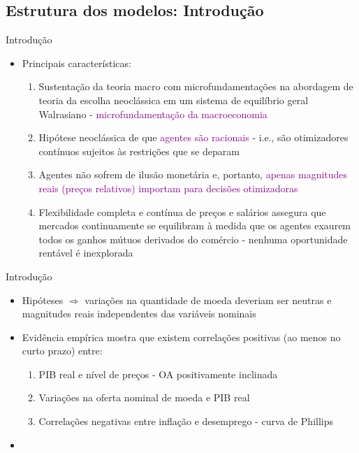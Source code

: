 \documentclass[10pt]{beamer}
\begin{document}
\subsection{Estrutura dos modelos: Introdução}
\begin{frame}{Introdução}
    \begin{itemize}
        \item Principais características:
        \bigskip
        \begin{enumerate}
            \item Sustentação da teoria macro com microfundamentações na abordagem de teoria da escolha neoclássica em um sistema de equilíbrio geral Walrasiano - \textcolor{purple}{microfundamentação da macroeconomia}
            \bigskip
            \item Hipótese neoclássica de que \textcolor{purple}{agentes são racionais} - i.e., são otimizadores contínuos sujeitos às restrições que se deparam
            \bigskip
            \item Agentes não sofrem de ilusão monetária e, portanto, \textcolor{purple}{apenas magnitudes reais (preços relativos) importam para decisões otimizadoras}
            \bigskip
            \item Flexibilidade completa e contínua de preços e salários assegura que mercados continuamente se equilibram à medida que os agentes exaurem todos os ganhos mútuos derivados do comércio - nenhuma oportunidade rentável é inexplorada
        \end{enumerate}
    \end{itemize}
\end{frame}

\begin{frame}{Introdução}
    \begin{itemize}
        \item Hipóteses $\Rightarrow$ variações na quantidade de moeda deveriam ser neutras e magnitudes reais independentes das variáveis nominais
        \bigskip
        \item Evidência empírica mostra que existem correlações positivas (ao menos no curto prazo) entre:
        \bigskip
        \begin{enumerate}
            \item PIB real e nível de preços - OA positivamente inclinada
            \bigskip
            \item Variações na oferta nominal de moeda e PIB real
            \bigskip
            \item Correlações negativas entre inflação e desemprego - curva de Phillips
        \end{enumerate}
        \bigskip
        \item {}
    \end{itemize}
\end{frame}
\end{document}
